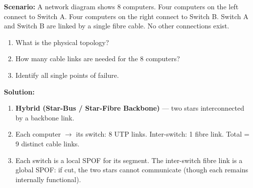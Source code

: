 \documentclass[11pt]{article}
\begin{document}
\begin{exemplebox}
\textbf{Scenario:} A network diagram shows 8 computers. Four computers on the left connect to Switch A. Four computers on the right connect to Switch B. Switch A and Switch B are linked by a single fibre cable. No other connections exist.
\begin{enumerate}
\item What is the physical topology?
\item How many cable links are needed for the 8 computers?
\item Identify all single points of failure.
\end{enumerate}
\textbf{Solution:}
\begin{enumerate}
\item \textbf{Hybrid (Star-Bus / Star-Fibre Backbone)} — two stars interconnected by a backbone link.
\item Each computer $\rightarrow$ its switch: 8 UTP links. Inter-switch: 1 fibre link. Total = 9 distinct cable links.
\item Each switch is a local SPOF for its segment. The inter-switch fibre link is a global SPOF: if cut, the two stars cannot communicate (though each remains internally functional).
\end{enumerate}
\end{exemplebox}
\end{document}

